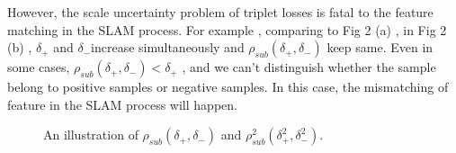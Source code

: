 \documentclass[letterpaper, 10 pt, conference]{ieeeconf}  %
\begin{document}
However, the scale uncertainty problem of triplet losses is fatal to the feature matching in the SLAM process.  For example ,  comparing to  Fig 2 (a)  , in  Fig 2 (b) , $\delta _{+}$ and $\delta _{-}$increase simultaneously and $\rho _{sub}\left ( \delta _{+} , \delta _{-} \right )$ keep same. Even  in some cases, $\rho _{sub}\left ( \delta _{+} , \delta _{-} \right ) < \delta _{+}$ , and we can't distinguish whether the sample belong to positive samples or negative samples. In this case, the mismatching  of feature  in the SLAM process will happen.

\begin{figure}[htbp]
\centering
{}%
%
\centering
\caption{ An illustration of   $\rho _{sub}\left ( \delta _{+} , \delta _{-} \right ) $ and $\rho _{sub}^{2}\left ( \delta _{+}^{2} , \delta _{-}^{2} \right ) $. }
\end{figure}
\end{document}
